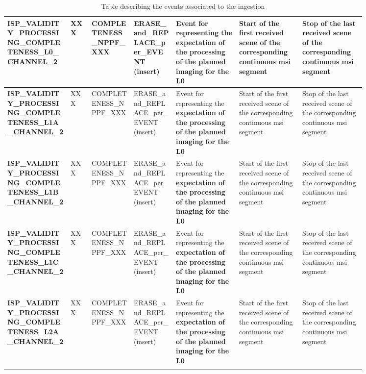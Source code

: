 \begin{landscape}
\begin{longtable}{|M{0.15\linewidth}|M{0.05\linewidth}|M{0.10\linewidth}|M{0.10\linewidth}|M{0.15\linewidth}|M{0.15\linewidth}|M{0.15\linewidth}|}
\textbf{ISP\_VALIDITY\_PROCESSING\_COMPLETENESS\_L0\_CHANNEL\_2} & XXX & \- COMPLETENESS\_NPPF\_XXX & ERASE\_and\_REPLACE\_per\_EVENT (insert) & Event for representing the \textbf{expectation of the processing of the planned imaging for the L0} & Start of the first received scene of the corresponding continuous \acrshort{msi} segment & Stop of the last received scene of the corresponding continuous \acrshort{msi} segment \\ \hline
\textbf{ISP\_VALIDITY\_PROCESSING\_COMPLETENESS\_L1A\_CHANNEL\_2} & XXX & \- COMPLETENESS\_NPPF\_XXX & ERASE\_and\_REPLACE\_per\_EVENT (insert) & Event for representing the \textbf{expectation of the processing of the planned imaging for the L0} & Start of the first received scene of the corresponding continuous \acrshort{msi} segment & Stop of the last received scene of the corresponding continuous \acrshort{msi} segment \\ \hline
\textbf{ISP\_VALIDITY\_PROCESSING\_COMPLETENESS\_L1B\_CHANNEL\_2} & XXX & \- COMPLETENESS\_NPPF\_XXX & ERASE\_and\_REPLACE\_per\_EVENT (insert) & Event for representing the \textbf{expectation of the processing of the planned imaging for the L0} & Start of the first received scene of the corresponding continuous \acrshort{msi} segment & Stop of the last received scene of the corresponding continuous \acrshort{msi} segment \\ \hline
\textbf{ISP\_VALIDITY\_PROCESSING\_COMPLETENESS\_L1C\_CHANNEL\_2} & XXX & \- COMPLETENESS\_NPPF\_XXX & ERASE\_and\_REPLACE\_per\_EVENT (insert) & Event for representing the \textbf{expectation of the processing of the planned imaging for the L0} & Start of the first received scene of the corresponding continuous \acrshort{msi} segment & Stop of the last received scene of the corresponding continuous \acrshort{msi} segment \\ \hline
\textbf{ISP\_VALIDITY\_PROCESSING\_COMPLETENESS\_L2A\_CHANNEL\_2} & XXX & \- COMPLETENESS\_NPPF\_XXX & ERASE\_and\_REPLACE\_per\_EVENT (insert) & Event for representing the \textbf{expectation of the processing of the planned imaging for the L0} & Start of the first received scene of the corresponding continuous \acrshort{msi} segment & Stop of the last received scene of the corresponding continuous \acrshort{msi} segment \\ \hline
\caption{Table describing the events associated to the ingestion}
\label{tb:description_events_ingestion_dfep_acquisition}
\end{longtable}
\end{landscape}
